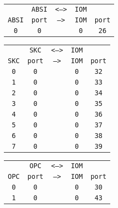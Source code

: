 \begin{adjustwidth}{5ex}{1ex}
	\begin{tabular}{ccccc}
		& \texttt{ABSI} & \texttt{<-->} & \texttt{IOM} &  \\
		\texttt{ABSI} & \texttt{port} & \texttt{-->} & \texttt{IOM} & \texttt{port} \\
		\texttt{0} & \texttt{0} & & \texttt{0} & \texttt{26} \\
	\end{tabular}
\end{adjustwidth}

\begin{adjustwidth}{5ex}{1ex}
	\begin{tabular}{ccccc}
		& \texttt{SKC} & \texttt{<-->} & \texttt{IOM} &  \\
		\texttt{SKC} & \texttt{port} & \texttt{-->} & \texttt{IOM} & \texttt{port} \\
		\texttt{0} & \texttt{0} & & \texttt{0} & \texttt{32} \\
		\texttt{1} & \texttt{0} & & \texttt{0} & \texttt{33} \\
		\texttt{2} & \texttt{0} & & \texttt{0} & \texttt{34} \\
		\texttt{3} & \texttt{0} & & \texttt{0} & \texttt{35} \\
		\texttt{4} & \texttt{0} & & \texttt{0} & \texttt{36} \\
		\texttt{5} & \texttt{0} & & \texttt{0} & \texttt{37} \\
		\texttt{6} & \texttt{0} & & \texttt{0} & \texttt{38} \\
		\texttt{7} & \texttt{0} & & \texttt{0} & \texttt{39} \\
	\end{tabular}
\end{adjustwidth}

\begin{adjustwidth}{5ex}{1ex}
	\begin{tabular}{ccccc}
		& \texttt{OPC} & \texttt{<-->} & \texttt{IOM} &  \\
		\texttt{OPC} & \texttt{port} & \texttt{-->} & \texttt{IOM} & \texttt{port} \\
		\texttt{0} & \texttt{0} & & \texttt{0} & \texttt{30} \\
		\texttt{1} & \texttt{0} & & \texttt{0} & \texttt{43} \\
	\end{tabular}
\end{adjustwidth}


